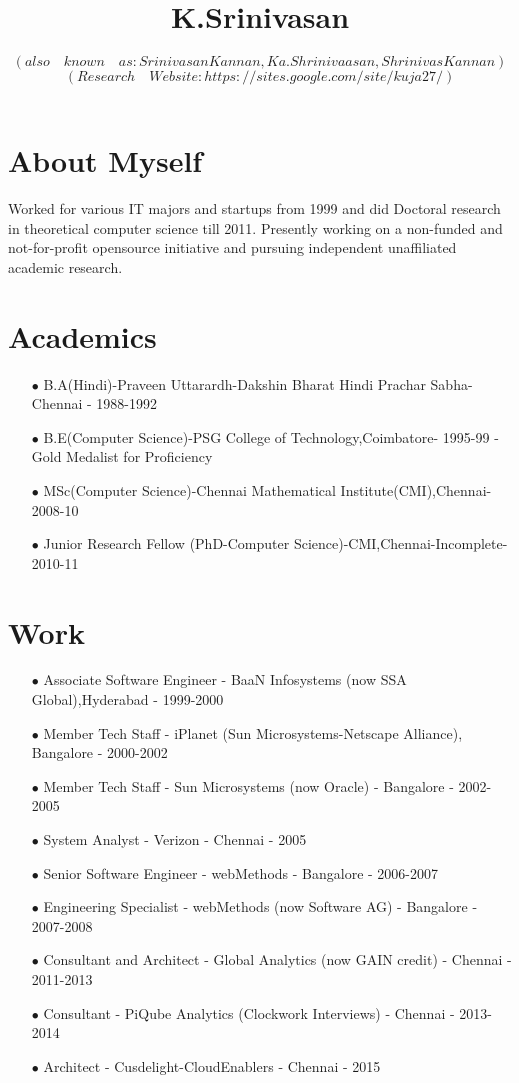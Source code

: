 \documentclass[11pt,onecolumn]{article}
\author{ $ (also \quad known \quad as: Srinivasan Kannan, Ka.Shrinivaasan, Shrinivas Kannan)$ \\
$ (Research \quad Website: https://sites.google.com/site/kuja27/) $ \\
}
\title{K.Srinivasan}
\date{}
\begin{document}
\thispagestyle{empty}
\pagestyle{empty}
\maketitle

\section{About Myself}
Worked for various IT majors and startups from 1999 and did Doctoral research in theoretical computer science till 2011. Presently working on a non-funded and not-for-profit opensource initiative and pursuing independent unaffiliated academic research.

\section{Academics}
\begin{enumerate}
\item[$\bullet$] B.A(Hindi)-Praveen Uttarardh-Dakshin Bharat Hindi Prachar Sabha-Chennai - 1988-1992
\item[$\bullet$] B.E(Computer Science)-PSG College of Technology,Coimbatore- 1995-99 - Gold Medalist for Proficiency
\item[$\bullet$] MSc(Computer Science)-Chennai Mathematical Institute(CMI),Chennai- 2008-10
\item[$\bullet$] Junior Research Fellow (PhD-Computer Science)-CMI,Chennai-Incomplete- 2010-11
\end{enumerate}

\section{Work}
\begin{enumerate}
\item[$\bullet$] Associate Software Engineer - BaaN Infosystems (now SSA Global),Hyderabad - 1999-2000
\item[$\bullet$] Member Tech Staff - iPlanet (Sun Microsystems-Netscape Alliance), Bangalore - 2000-2002
\item[$\bullet$] Member Tech Staff - Sun Microsystems (now Oracle) - Bangalore - 2002-2005
\item[$\bullet$] System Analyst - Verizon - Chennai - 2005
\item[$\bullet$] Senior Software Engineer - webMethods - Bangalore - 2006-2007
\item[$\bullet$] Engineering Specialist - webMethods (now Software AG) - Bangalore - 2007-2008
\item[$\bullet$] Consultant and Architect - Global Analytics (now GAIN credit) - Chennai - 2011-2013
\item[$\bullet$] Consultant - PiQube Analytics (Clockwork Interviews) - Chennai - 2013-2014
\item[$\bullet$] Architect - Cusdelight-CloudEnablers - Chennai - 2015
\end{enumerate}
\end{document}
